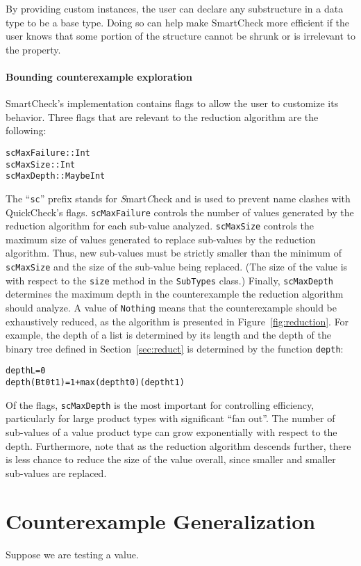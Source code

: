\documentclass[10pt]{sigplanconf}
\newenvironment{code}{\begin{alltt}}{\end{alltt}}
\newcommand{\ttp}[1]{\texttt{#1}}
\begin{document}
By providing custom instances, the user can declare any substructure in a data
type to be a base type.  Doing so can help make SmartCheck more efficient if the
user knows that some portion of the structure cannot be shrunk or is irrelevant
to the property.

\paragraph{Bounding counterexample exploration}

SmartCheck's implementation contains flags to allow the user to customize its
behavior.  Three flags that are relevant to the reduction algorithm are the
following:
%
\begin{code}
scMaxFailure :: Int
scMaxSize    :: Int
scMaxDepth   :: Maybe Int  
\end{code}
%
\noindent
The ``\ttp{sc}'' prefix stands for \emph{S}mart\emph{C}heck and is used to
prevent name clashes with QuickCheck's flags.  \ttp{scMaxFailure} controls the
number of values generated by the reduction algorithm for each sub-value
analyzed.  \ttp{scMaxSize} controls the maximum size of values generated to
replace sub-values by the reduction algorithm.  Thus, new sub-values must be
strictly smaller than the minimum of \ttp{scMaxSize} and the size of the
sub-value being replaced.  (The size of the value is with respect to the
\ttp{size} method in the \ttp{SubTypes} class.)  Finally, \ttp{scMaxDepth}
determines the maximum depth in the counterexample the reduction algorithm
should analyze.  A value of \ttp{Nothing} means that the counterexample should
be exhaustively reduced, as the algorithm is presented in
Figure~\ref{fig:reduction}.  For example, the depth of a list is determined by
its length and the depth of the binary tree defined in Section~\ref{sec:reduct}
is determined by the function \ttp{depth}:
%
\begin{code}
depth L         = 0
depth (B t0 t1) = 1 + max (depth t0) (depth t1)
\end{code}
%
\noindent
Of the flags, \ttp{scMaxDepth} is the most important for controlling
efficiency, particularly for large product types with significant ``fan out''.
The number of sub-values of a value product type can grow exponentially with
respect to the depth.  Furthermore, note that as the reduction algorithm
descends further, there is less chance to reduce the size of the value overall,
since smaller and smaller sub-values are replaced.

\section{Counterexample Generalization} \label{sec:generalization}
Suppose we are testing a value.
\end{document}
